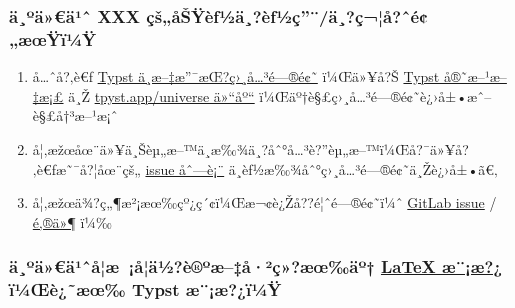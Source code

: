 \subsubsection{ä¸ºä»€ä¹ˆ XXX
çš„åŠŸèƒ½ä¸?èƒ½ç''¨/ä¸?ç¬¦å?ˆé¢„æœŸï¼Ÿ}\label{uxe4uxbauxe4uxe4uxb9ux2c6-xxx-uxe7ux161uxe5ux161uxffuxe8ux192uxbduxe4uxe8ux192uxbduxe7uxe4uxe7uxe5ux2c6uxe9uxe6ux153uxffuxefuxbcuxff}

\begin{enumerate}
\tightlist
\item
  å\ldots ˆå?‚è€ƒ
  \href{https://typst-doc-cn.github.io/docs/chinese/}{Typst
  ä¸­æ--‡æ''¯æŒ?ç›¸å\ldots³é---®é¢˜} ï¼Œä»¥å?Š
  \href{https://typst.app/docs/}{Typst å®˜æ--¹æ--‡æ¡£} ä¸Ž
  \href{https://typst.app/universe}{tpyst.app/universe ä»``åº``}
  ï¼Œäº†è§£ç›¸å\ldots³é---®é¢˜è¿›å±•æˆ--è§£å†³æ--¹æ¡ˆ
\item
  å¦‚æžœåœ¨ä»¥ä¸Šèµ„æ--™ä¸­æ‰¾ä¸?åˆ°å\ldots³è?''èµ„æ--™ï¼Œå?¯ä»¥å?‚è€ƒæ˜¯å?¦åœ¨çš„
  \href{https://gitlab.com/sysu-gitlab/thesis-template/better-thesis/-/issues}{issue
  åˆ---è¡¨} ä¸­èƒ½æ‰¾åˆ°ç›¸å\ldots³é---®é¢˜ä¸Žè¿›å±•ã€‚
\item
  å¦‚æžœä¾?ç„¶æ²¡æœ‰çº¿ç´¢ï¼Œæ¬¢è¿Žå??é¦ˆé---®é¢˜ï¼ˆ
  \href{https://gitlab.com/sysu-gitlab/thesis-template/better-thesis/-/issues}{GitLab
  issue} /
  \href{mailto:contact-project+sysu-gitlab-thesis-template-better-thesis-57823416-issue-@incoming.gitlab.com}{é‚®ä»¶}
  ï¼‰
\end{enumerate}

\subsubsection{\texorpdfstring{ä¸ºä»€ä¹ˆå­¦æ~¡å­¦ä½?è®ºæ--‡å·²ç»?æœ‰äº†
\href{https://github.com/SYSU-SCC/sysu-thesis}{LaTeX æ¨¡æ?¿} ï¼Œè¿˜æœ‰
Typst
æ¨¡æ?¿ï¼Ÿ}{ä¸ºä»€ä¹ˆå­¦æ~¡å­¦ä½?è®ºæ--‡å·²ç»?æœ‰äº† LaTeX æ¨¡æ?¿ ï¼Œè¿˜æœ‰ Typst æ¨¡æ?¿ï¼Ÿ}}\label{uxe4uxbauxe4uxe4uxb9ux2c6uxe5uxe6-uxe5uxe4uxbduxe8uxbauxe6uxe5uxb2uxe7uxe6ux153uxe4uxba-latex-uxe6uxe6-uxefuxbcux153uxe8uxe6ux153-typst-uxe6uxe6uxefuxbcuxff}

